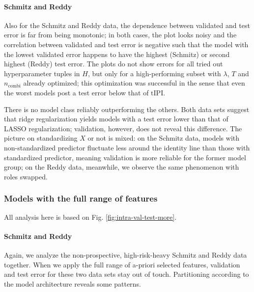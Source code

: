 \paragraph{Schmitz and Reddy}
Also for the Schmitz and Reddy data, the dependence between validated and test error is far from 
being monotonic; in both cases, the plot looks noisy and the correlation between validated and test 
error is negative such that the model with the lowest validated error happens to have the highest 
(Schmitz) or second highest (Reddy) test error. The plots do not show errors for all tried out 
hyperparameter tuples in $H$, but only for a high-performing subset with $\lambda$, $T$ and 
$n_\text{combi}$ already 
optimized; this optimization was successful in the sense that even the worst models post a test 
error below that of $\text{tIPI}$.

There is no model class reliably outperforming the others. Both data sets suggest that ridge 
regularization yields models with a test error lower than that of LASSO regularization; validation, 
however, does not reveal this difference. The picture on standardizing $X$ or not is mixed: on the 
Schmitz data, models with non-standardized predictor fluctuate less around the identity line than 
those with standardized predictor, meaning validation is more reliable for the former model group;
on the Reddy data, meanwhile, we observe the same phenomenon with roles swapped.

\subsubsection{Models with the full range of features}



All analysis here is based on Fig. \ref{fig:intra-val-test-more}.

\paragraph{Schmitz and Reddy}
Again, we analyze the non-prospective, high-risk-heavy Schmitz and Reddy data together. When we apply
the full range of a-priori selected features, validation and test error for these two data sets 
stay out of touch. Partitioning according to the model architecture reveals some patterns. 

